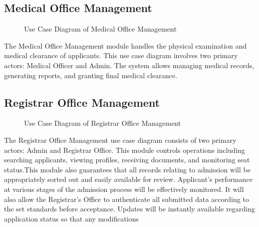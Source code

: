 
% 



% 


\subsection{Medical Office Management}

\begin{figure}[htbp]
    \centering
    
    \caption{Use Case Diagram of Medical Office Management}
    \label{fig:medical_usecase}
\end{figure}

The Medical Office Management module handles the physical examination and medical clearance of applicants. This use case diagram involves two primary actors: Medical Officer and Admin. The system allows managing medical records, generating reports, and granting final medical clearance.

% 




% 
% 
% 

\clearpage

\subsection{Registrar Office Management}

\begin{figure}[htbp]
\centering

\caption{Use Case Diagram of Registrar Office Management}
\label{fig:registrar_usecase}
\end{figure}

\noindent The Registrar Office Management use case diagram consists of two primary actors: Admin and Registrar Office. This module controls operations including searching applicants, viewing profiles, receiving documents, and monitoring seat status.This module also guarantees that all records relating to admission will be appropriately sorted out and easily available for review. Applicant’s performance at various stages of the admission process will be effectively monitored. It will also allow the Registrar’s Office to authenticate all submitted data according to the set standards before acceptance. Updates will be instantly available regarding application status so that any modifications 
\clearpage

